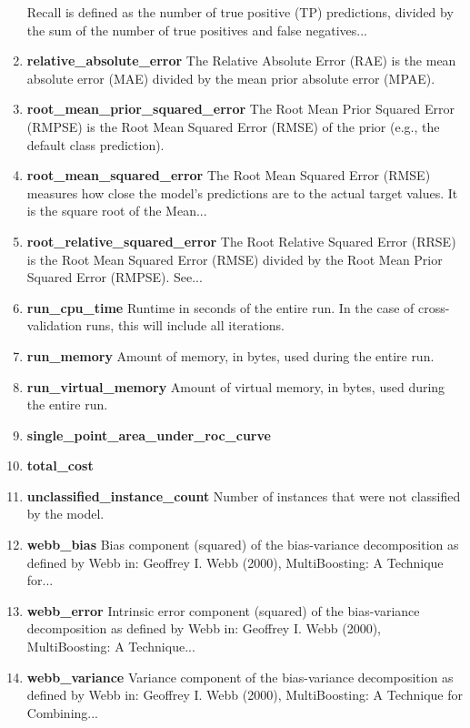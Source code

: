 \documentclass[a4paper,12pt, english]{article}
\begin{document}
\begin{enumerate}
Recall is defined as the number of true positive (TP) predictions, divided by the sum of the number of true positives and false negatives...
\item \textbf{relative\_absolute\_error}
The Relative Absolute Error (RAE) is the mean absolute error (MAE) divided by the mean prior absolute error (MPAE).
\item \textbf{root\_mean\_prior\_squared\_error}
The Root Mean Prior Squared Error (RMPSE) is the Root Mean Squared Error (RMSE) of the prior (e.g., the default class prediction).
\item \textbf{root\_mean\_squared\_error}
The Root Mean Squared Error (RMSE) measures how close the model's predictions are to the actual target values. It is the square root of the Mean...
\item \textbf{root\_relative\_squared\_error}
The Root Relative Squared Error (RRSE) is the Root Mean Squared Error (RMSE) divided by the Root Mean Prior Squared Error (RMPSE). See...
\item \textbf{run\_cpu\_time}
Runtime in seconds of the entire run. In the case of cross-validation runs, this will include all iterations.
\item \textbf{run\_memory}
Amount of memory, in bytes, used during the entire run.
\item \textbf{run\_virtual\_memory}
Amount of virtual memory, in bytes, used during the entire run.
\item \textbf{single\_point\_area\_under\_roc\_curve}
\item \textbf{total\_cost}
\item \textbf{unclassified\_instance\_count}
Number of instances that were not classified by the model.
\item \textbf{webb\_bias}
Bias component (squared) of the bias-variance decomposition as defined by Webb in: Geoffrey I. Webb (2000), MultiBoosting: A Technique for...
\item \textbf{webb\_error}
Intrinsic error component (squared) of the bias-variance decomposition as defined by Webb in: Geoffrey I. Webb (2000), MultiBoosting: A Technique...
\item \textbf{webb\_variance}
Variance component of the bias-variance decomposition as defined by Webb in: Geoffrey I. Webb (2000), MultiBoosting: A Technique for Combining...



\end{enumerate}
\end{document}

